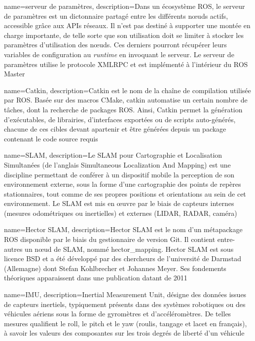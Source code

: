 {
  name={serveur de paramètres},
    description={Dans un écosystème \gls{ROS}, le serveur de paramètres est un dictonnaire partagé entre les différents n\oe{}uds actifs, accessible grâce aux APIs réseaux. 
    Il n'est pas destiné à supporter une montée en charge importante, de telle sorte que son utilisation doit se limiter à stocker les paramètres d'utilisation des n\oe{}uds. 
    Ces derniers pourront récupérer leurs variables de configuration au \emph{runtime} en invoquant le serveur.
    Le serveur de paramètres utilise le protocole \gls{XMLRPC} et est implémenté à l'intérieur du ROS Master}
}

{
  name={Catkin},
    description={Catkin est le nom de la chaîne de compilation utilisée par ROS. 
    Basée sur des macros CMake, catkin automatise un certain nombre de tâches, dont la recherche de packages ROS. 
    Ainsi, Catkin permet la génération d'exécutables, de librairies, d'interfaces exportées ou de scripts auto-générés, 
    chacune de ces cibles devant apartenir et être générées depuis un package contenant le code source requis}
}

{
  name={SLAM},
    description={Le SLAM pour Cartographie et Localisation Simultanées (de l'anglais Simultaneous Localization And Mapping) est une discipline permettant 
    de conférer à un dispositif mobile la perception de son environnement externe, sous la forme d'une cartographie des points de repères stationnaires, tout comme de ses 
    propres positions et orientations au sein de cet environnement. 
    Le SLAM est mis en \oe{}uvre par le biais de capteurs internes (mesures odométriques ou inertielles) et externes (LIDAR, RADAR, caméra)}
}

{
  name={Hector SLAM},
    description={Hector SLAM est le nom d'un métapackage ROS disponible par le biais du gestionnaire de version Git. 
    Il contient entre-autres un n\oe{}ud de SLAM, nommé hector\_mapping. Hector SLAM est sous licence BSD et a été développé par des chercheurs de l'université de Darmstad (Allemagne) dont 
    Stefan Kohlbrecher et Johannes Meyer. Ses fondements théoriques apparaissent dans une publication datant de 2011\cite{Bib_Hector_SLAM}}
}

{
  name={IMU},
    description={Inertial Measurement Unit, désigne des données issues de capteurs inertiels, typiquement présents dans des systèmes robotiques ou des véhicules aériens sous la forme de gyromètres et d'accéléromètres.
    De telles mesures qualifient le roll, le pitch et le yaw (roulis, tangage et lacet en français), à savoir les valeurs des composantes sur les trois degrés de liberté d'un véhicule}
}

